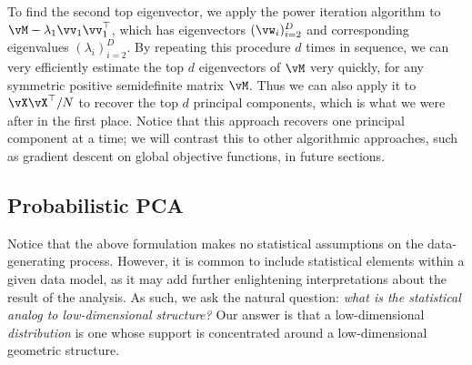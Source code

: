 \documentclass[../../book-main.tex]{subfiles}
\begin{document}

To find the second top eigenvector, we apply the power iteration algorithm to \(\vM - \lambda_{1}\vv_{1}\vv_{1}^{\top}\), which has eigenvectors \((\vw_{i})_{i = 2}^{D}\) and corresponding eigenvalues \((\lambda_{i})_{i = 2}^{D}\). By repeating this procedure \(d\) times in sequence, we can very efficiently estimate the top \(d\) eigenvectors of \(\vM\) very quickly, for any symmetric positive semidefinite matrix \(\vM\). Thus we can also apply it to \(\vX\vX^{\top}/N\) to recover the top \(d\) principal components, which is what we were after in the first place. Notice that this approach recovers one principal component at a time; we will contrast this to other algorithmic approaches, such as gradient descent on global objective functions, in future sections.





\subsection{Probabilistic PCA}\label{subsec:probabilistic PCA}

Notice that the above formulation makes no statistical assumptions on the data-generating process. However, it is common to include statistical elements within a given data model, as it may add further enlightening interpretations about the result of the analysis. As such, we ask the natural question: \textit{what is the statistical analog to low-dimensional structure?} Our answer is that a low-dimensional \textit{distribution} is one whose support is concentrated around a low-dimensional geometric structure. 
\end{document}
